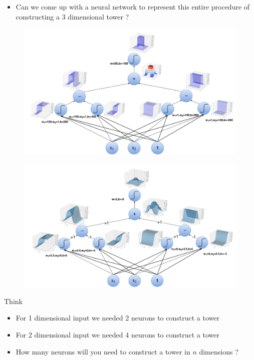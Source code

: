\begin{frame}
	\begin{itemize}\justifying
		\item Can we come up with a neural network to represent this entire procedure of constructing a 3 dimensional tower ?
	\end{itemize}
\end{frame}

\begin{frame}
	\begin{figure}
		\includegraphics[scale=0.25]{images/module5/Plots/nn_step}
	\end{figure}
\end{frame}

\begin{frame}
	\begin{figure}
		\includegraphics[scale=0.25]{images/module5/Plots/nn_g}
	\end{figure}
\end{frame}


\begin{frame}
	\begin{block}{Think}
		\begin{itemize}\justifying
			\item For 1 dimensional input we needed 2 neurons to construct a tower
			\item For 2 dimensional input we needed 4 neurons to construct a tower
			\item How many neurons will you need to construct a tower in $n$ dimensions ?
		\end{itemize}
	\end{block}
\end{frame}

